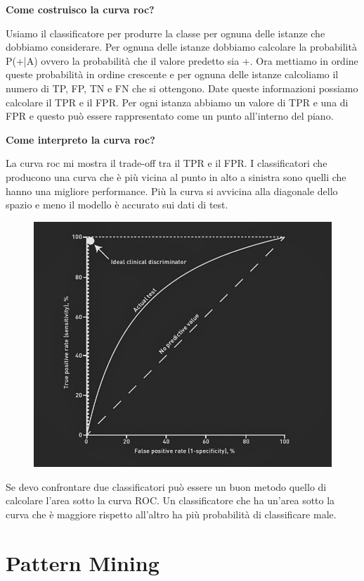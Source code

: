 \documentclass[14pt]{extreport}
\begin{document}
\begin{itemize}
\begin{figure}[H]
\end{figure}

\end{itemize}

\textbf{Come costruisco la curva roc?}

Usiamo il classificatore per produrre la classe per ognuna delle istanze che dobbiamo considerare.
Per ognuna delle istanze dobbiamo calcolare la probabilità P(+|A) ovvero la probabilità che il valore predetto sia +. Ora mettiamo in ordine queste probabilità in ordine crescente e per ognuna delle istanze calcoliamo il numero di TP, FP, TN e FN che si ottengono.
Date queste informazioni possiamo calcolare il TPR e il FPR. Per ogni istanza abbiamo un valore di TPR e una di FPR e questo può essere rappresentato come un punto all'interno del piano.

\textbf{Come interpreto la curva roc?}

La curva roc mi mostra il trade-off tra il TPR e il FPR. I classificatori che producono una curva che è più vicina al punto in alto a sinistra sono quelli che hanno una migliore performance.
Più la curva si avvicina alla diagonale dello spazio e meno il modello è accurato sui dati di test.

\begin{figure}[H]
\centering
  \includegraphics[width=0.7\linewidth]{ROC-curve-1-768x631.jpg}

\end{figure}

Se devo confrontare due classificatori può essere un buon metodo quello di calcolare l'area sotto la curva ROC. 
Un classificatore che ha un'area sotto la curva che è maggiore rispetto all'altro ha più probabilità di classificare male.

\newpage
\chapter{Pattern Mining}
\end{document}
